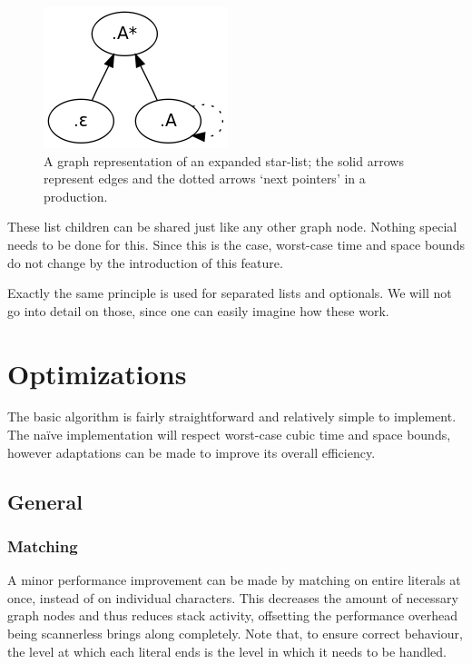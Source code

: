 \documentclass[a4paper,10pt]{article}
\begin{document}
\begin{figure}[H]
\centering
\includegraphics[scale=0.5]{star-list.png}
\caption{A graph representation of an expanded star-list; the solid arrows represent edges and the dotted arrows `next pointers' in a production.}
\end{figure}

These list children can be shared just like any other graph node. Nothing special needs to be done for this. Since this is the case, worst-case time and space bounds do not change by the introduction of this feature.

Exactly the same principle is used for separated lists and optionals. We will not go into detail on those, since one can easily imagine how these work.

\section{Optimizations}
\label{chap:optimizations}

The basic algorithm is fairly straightforward and relatively simple to implement. The naïve implementation will respect worst-case cubic time and space bounds, however adaptations can be made to improve its overall efficiency.

\subsection{General}

\subsubsection{Matching}
A minor performance improvement can be made by matching on entire literals at once, instead of on individual characters. This decreases the amount of necessary graph nodes and thus reduces stack activity, offsetting the performance overhead being scannerless brings along completely. Note that, to ensure correct behaviour, the level at which each literal ends is the level in which it needs to be handled.
\end{document}
